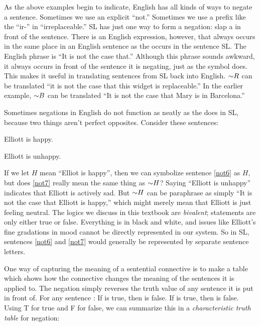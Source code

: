 As the above examples begin to indicate, English has all kinds of ways to negate a sentence.  Sometimes we use an explicit ``not.'' Sometimes we use a prefix like the ``ir-'' in ``irreplaceable.'' SL has just one way to form a negation: slap a \enot in front of the sentence. There is an English expression, however, that always occurs in the same place in an English sentence as the \enot occurs in the sentence SL. The English phrase is ``It is not the case that.'' Although this phrase sounds awkward, it always occurs in front of the sentence it is negating, just as the symbol \enot does. This makes it useful in translating sentences from SL back into English. $\mathord{\sim} R$ can be translated ``it is not the case that this widget is replaceable.'' In the earlier example, $\mathord{\sim} B$ can be translated ``It is not the case that Mary is in Barcelona.'' 


Sometimes negations in English do not function as neatly as the \enot does in SL, because two things aren't perfect opposites. Consider these sentences:

\begin{earg}
\item[\ex{not6}] Elliott is happy.
\item[\ex{not7}] Elliott is unhappy.
\end{earg}


If we let $H$ mean ``Elliot is happy'', then we can symbolize sentence \ref{not6} as $H$, but does \ref{not7} really mean the same thing as $\mathord{\sim} H$? Saying ``Elliott is unhappy'' 
indicates that Elliott is actively sad. But $\mathord{\sim} H$ can be paraphrase as simply ``It is not the case that Elliott is happy,'' which might merely mean that Elliott is just feeling 
neutral. The logics we discuss in this textbook are \emph{bivalent}; statements are only either true or false. Everything is in black and white, 
and issues like Elliott's fine gradations in mood cannot be directly represented in our system. So in SL, sentences \ref{not6} and \ref{not7} would generally be represented by separate 
sentence letters.

One way of capturing the meaning of a sentential connective is to make a table which shows how the connective changes the meaning of the sentences it is applied to. The negation simply 
reverses the truth value of any sentence it is put in front of. For any sentence : If  is true, then \enot{} is false. If \enot{} is true, then 
 is false. Using T for true and F for false, we can summarize this in a \emph{characteristic truth table} for negation:

